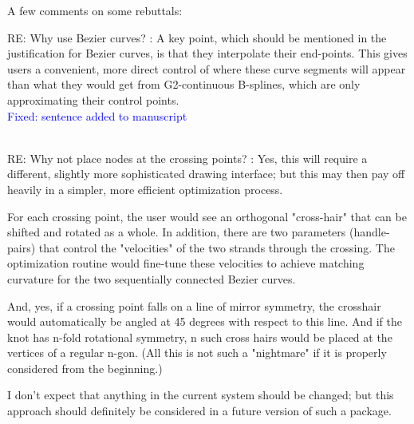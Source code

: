 \documentclass[12pt]{article}
\begin{document}
A few comments on some rebuttals:

RE: Why use Bezier curves? : A key point, which should be mentioned in
the justification for Bezier curves, is that they interpolate their
end-points. This gives users a convenient, more direct control of
where these curve segments will appear than what they would get from
G2-continuous B-splines, which are only approximating their control
points.\textcolor{blue}{\\Fixed: sentence added to manuscript\\ \\}

RE: Why not place nodes at the crossing points? : Yes, this will
require a different, slightly more sophisticated drawing interface;
but this may then pay off heavily in a simpler, more efficient
optimization process.

For each crossing point, the user would see an orthogonal "cross-hair"
that can be shifted and rotated as a whole.  In addition, there are
two parameters (handle-pairs) that control the "velocities" of the two
strands through the crossing.  The optimization routine would
fine-tune these velocities to achieve matching curvature for the two
sequentially connected Bezier curves.

And, yes, if a crossing point falls on a line of mirror symmetry, the
crosshair would automatically be angled at 45 degrees with respect to
this line.  And if the knot has n-fold rotational symmetry, n such
cross hairs would be placed at the vertices of a regular n-gon.  (All
this is not such a "nightmare" if it is properly considered from the
beginning.)

I don't expect that anything in the current system should be changed;
but this approach should definitely be considered in a future version
of such a package.
\end{document}
